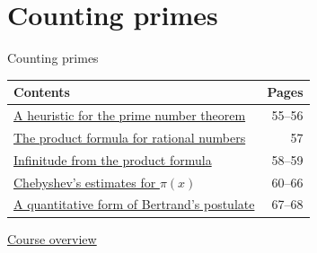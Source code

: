 \documentclass[aspectratio=169,11pt]{beamer}
\begin{document}
\section{Counting primes}

\begin{frame}{Counting primes}
\small\renewcommand{\arraystretch}{1.35}
\begin{tabular}{p{}r}\textbf{Contents}&\textbf{Pages}\\\midrule
\hyperlink{Navigation55}{A heuristic for the prime number theorem}&55--56\\
\hyperlink{Navigation57}{The product formula for rational numbers}&57\\
\hyperlink{Navigation58}{Infinitude from the product formula}&58--59\\
\hyperlink{Navigation60}{Chebyshev's estimates for $\pi(x)$}&60--66\\
\hyperlink{Navigation67}{A quantitative form of Bertrand's postulate}&67--68\\
\end{tabular}\par\medskip\hyperlink{overview}{\color{teal}Course overview}\end{frame}
\end{document}
